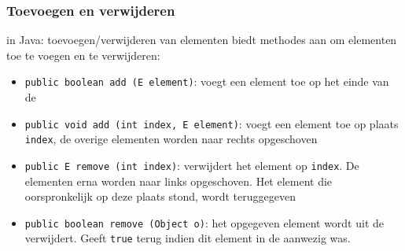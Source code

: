 \subsubsection{Toevoegen en verwijderen}
\begin{frame}[fragile]{\dsarraylist{} in Java: toevoegen/verwijderen van elementen}
\dsarraylist{} biedt methodes aan om elementen toe te voegen en te verwijderen:
\small{\begin{itemize}
 \item \texttt{public boolean add (E element)}: voegt een element toe op het einde van de \dsarraylist{}
 \item \texttt{public void add (int index, E element)}: voegt een element toe op plaats \texttt{index}, de overige elementen worden naar rechts opgeschoven
 \item \texttt{public E remove (int index)}: verwijdert het element op \texttt{index}. De elementen erna worden naar links opgeschoven. Het element die oorspronkelijk op deze plaats stond, wordt teruggegeven
 \item \texttt{public boolean remove (Object o)}: het opgegeven element wordt uit de \dsarraylist{} verwijdert. Geeft \texttt{true} terug indien dit element in de \dsarraylist{} aanwezig was.
\end{itemize}}
\end{frame}
